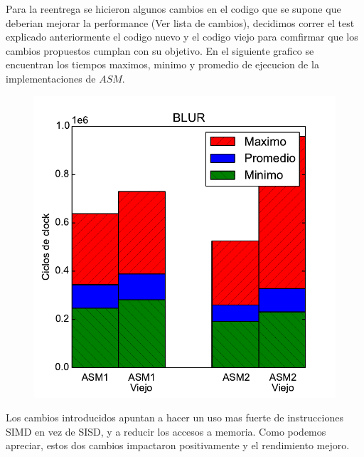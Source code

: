 Para la reentrega se hicieron algunos cambios en el codigo que se supone que deberian mejorar la performance (Ver lista de cambios), decidimos correr el test explicado anteriormente el codigo nuevo y el codigo viejo para comfirmar que los cambios propuestos cumplan con su objetivo. En el siguiente grafico se encuentran los tiempos maximos, minimo y promedio de ejecucion de la implementaciones de $ASM$.

\begin{figure}[h!]
	\centering
	\includegraphics[scale=0.45]{images/blur_comparationOLD}
\end{figure}

\newpage

Los cambios introducidos apuntan a hacer un uso mas fuerte de instrucciones SIMD en vez de SISD, y a reducir los accesos a memoria. Como podemos apreciar, estos dos cambios impactaron positivamente y el rendimiento mejoro.


